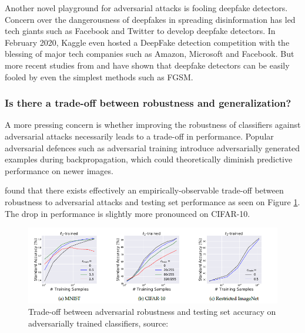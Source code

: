 \vspace{0.2cm}

Another novel playground for adversarial attacks is fooling deepfake detectors. Concern over the dangerousness of deepfakes in spreading disinformation has led tech giants such as Facebook and Twitter to develop deepfake detectors. In February 2020, Kaggle even hosted a DeepFake detection competition with the blessing of major tech companies such as Amazon, Microsoft and Facebook. But more recent studies from \cite{Neekhara2020AdversarialDE} and \cite{Gandhi2020AdversarialPF} have shown that deepfake detectors can be easily fooled by even the simplest methods such as FGSM.


\subsubsection{Is there a trade-off between robustness and generalization?}

A more pressing concern is whether improving the robustness of classifiers against adversarial attacks necessarily leads to a trade-off in performance. Popular adversarial defences such as adversarial training introduce adversarially generated examples during backpropagation, which could theoretically diminish predictive performance on newer images.

\cite{tsipras2018robustness} found that there exists effectively an empirically-observable trade-off between robustness to adversarial attacks and testing set performance as seen on Figure \ref{fig:Adv_005_Fig}. The drop in performance is slightly more pronounced on CIFAR-10.

\vspace{0.2cm}

\begin{figure}[H]
	\centering
	\includegraphics[scale=1.0]{images/adversarial_attacks/Adv_Fig_005_Robustness_1.PNG}
	\caption{Trade-off between adversarial robustness and testing set accuracy on adversarially trained classifiers, source: \cite{tsipras2018robustness}}
	\label{fig:Adv_005_Fig}
\end{figure}

